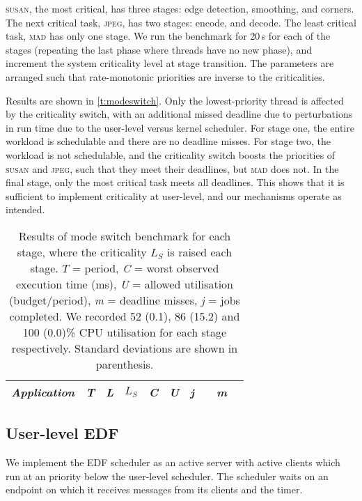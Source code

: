 \textsc{susan}, the most critical, has three stages: edge detection, smoothing, and corners. The
next critical task, \textsc{jpeg}, has two stages: encode, and decode. The least
critical task, \textsc{mad} has only one stage. We run the benchmark
for 20\,s for each of the stages (repeating the last phase where
threads have no new phase), and
increment the system criticality level at stage transition. The parameters are arranged such that rate-monotonic priorities are inverse to the criticalities.

Results are shown in \autoref{t:modeswitch}.
Only the lowest-priority thread is affected by the criticality switch, with an additional missed deadline due to
perturbations in run time due to the user-level versus kernel scheduler.
For stage one, the entire workload is schedulable and
there are no deadline misses. For stage two, the workload is not
schedulable, and the criticality switch boosts the priorities of
\textsc{susan} and \textsc{jpeg}, such that they meet
their deadlines, but
\textsc{mad} does not. In the final stage, only the most critical task
meets all deadlines.
This shows that it is sufficient to implement criticality at user-level, and our mechanisms operate as intended.

\begin{table}[h]
    \centering
    \begin{tabular}{lcccccclcl}\toprule
        \emph{Application} & \emph{T} & \emph{L} & \emph{\(L_S\)} & \emph{C} & \emph{U} & \emph{j} &
        & \emph{m}  & \\\midrule
        
        \bottomrule
    \end{tabular}
    \caption{Results of mode switch benchmark for each
        stage, where the  criticality \(L_S\) is raised each stage. \(T\) =
        period, \textit{C} = worst observed execution time (ms),
      \textit{U} = allowed utilisation (budget/period),
      \textit{m} = deadline misses, \textit{j} = jobs completed. We recorded 52 (0.1), 86 (15.2)
      and 100 (0.0)\% CPU
utilisation for each stage respectively. Standard deviations are shown in parenthesis.}
    \label{t:modeswitch}
\end{table}

\subsection{User-level EDF}\label{s:edf-impl}

We implement the EDF scheduler as an active server with active
clients which run at an \selfour priority below the user-level scheduler.
The scheduler waits on an endpoint on which it receives messages from
its clients and the timer.

